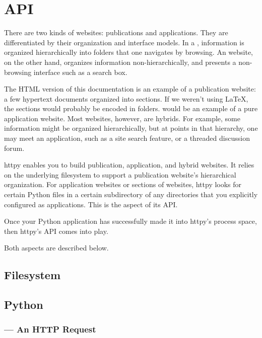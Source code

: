 \chapter{API}

There are two kinds of websites: publications and applications. They are
differentiated by their organization and interface models. In a
, information is organized hierarchically into folders that one
navigates by browsing. An  website, on the other hand,
organizes information non-hierarchically, and presents a non-browsing interface
such as a search box.

The HTML version of this documentation is an example of a publication website: a
few hypertext documents organized into sections. If we weren't using \LaTeX, the
sections would probably be encoded in folders.
 would be an example of a pure
application website. Most websites, however, are hybrids. For example, some
information might be organized hierarchically, but at points in that hierarchy,
one may meet an application, such as a site search feature, or a threaded
discussion forum.

httpy enables you to build publication, application, and hybrid websites. It
relies on the underlying filesystem to support a publication website's
hierarchical organization. For application websites or sections of websites,
httpy looks for certain Python files in a certain subdirectory of any
directories that you explicitly configured as applications. This is the
 aspect of its API.

Once your Python application has successfully made it into httpy's process
space, then httpy's  API comes into play.

Both aspects are described below.

\section{Filesystem}

\section{Python}

\subsection{ ---
            An HTTP Request}

